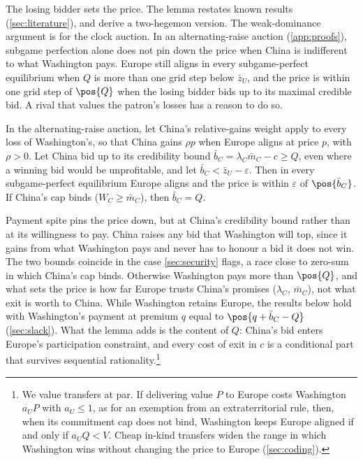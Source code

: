 The losing bidder sets the price. The lemma restates known results (\cref{sec:literature}), and \citet[Supplement B.2]{clayton2026framework} derive a two-hegemon version. The weak-dominance argument is for the clock auction. In an alternating-raise auction (\cref{app:proofs}), subgame perfection alone does not pin down the price when China is indifferent to what Washington pays. Europe still aligns in every subgame-perfect equilibrium when $Q$ is more than one grid step below $\bar z_U$, and the price is within one grid step of $\pos{Q}$ when the losing bidder bids up to its maximal credible bid. A rival that values the patron's losses has a reason to do so.

\begin{remark}\label{rem:spite}
In the alternating-raise auction, let China's relative-gains weight apply to every loss of Washington's, so that China gains $\rho p$ when Europe aligns at price $p$, with $\rho>0$. Let China bid up to its credibility bound $\bar b_C=\lambda_C\bar m_C-c\ge Q$, even where a winning bid would be unprofitable, and let $\bar b_C<\bar z_U-\varepsilon$. Then in every subgame-perfect equilibrium Europe aligns and the price is within $\varepsilon$ of $\pos{\bar b_C}$. If China's cap binds ($W_C\ge\bar m_C$), then $\bar b_C=Q$.
\end{remark}

Payment spite pins the price down, but at China's credibility bound rather than at its willingness to pay. China raises any bid that Washington will top, since it gains from what Washington pays and never has to honour a bid it does not win. The two bounds coincide in the case \cref{sec:security} flags, a race close to zero-sum in which China's cap binds. Otherwise Washington pays more than $\pos{Q}$, and what sets the price is how far Europe trusts China's promises ($\lambda_C$, $\bar m_C$), not what exit is worth to China. While Washington retains Europe, the results below hold with Washington's payment at premium $q$ equal to $\pos{q+\bar b_C-Q}$ (\cref{sec:slack}). What the lemma adds is the content of $Q$: China's bid enters Europe's participation constraint, and every cost of exit in $c$ is a conditional part that survives sequential rationality.\footnote{We value transfers at par. If delivering value $P$ to Europe costs Washington $a_U P$ with $a_U\le 1$, as for an exemption from an extraterritorial rule, then, when its commitment cap does not bind, Washington keeps Europe aligned if and only if $a_U Q<V$. Cheap in-kind transfers widen the range in which Washington wins without changing the price to Europe (\cref{sec:coding}).}

